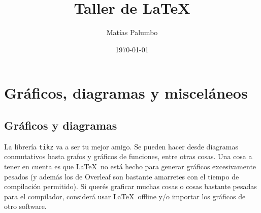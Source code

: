 \documentclass[12pt, spanish]{article}
\title{Taller de \LaTeX}
\author{Matías Palumbo}
\date{\today}
\begin{document}
\section{Gráficos, diagramas y misceláneos}

\subsection{Gráficos y diagramas}

La librería \verb|tikz| va a ser tu mejor amigo. Se pueden hacer desde diagramas conmutativos hasta grafos y gráficos de funciones, entre otras cosas. Una cosa a tener en cuenta es que \LaTeX\ no está hecho para generar gráficos excesivamente pesados (y además los de Overleaf son bastante amarretes con el tiempo de compilación permitido). Si querés graficar muchas cosas o cosas bastante pesadas para el compilador, considerá usar \LaTeX\ offline y/o importar los gráficos de otro software.
\end{document}
